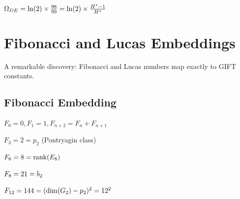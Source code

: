 \begin{theorem}\label{thm:Omega_DE_fraction}
    \leanok
    $\Omega_{DE} = \ln(2) \times \frac{98}{99} = \ln(2) \times \frac{H^* - 1}{H^*}$
\end{theorem}

\chapter{Fibonacci and Lucas Embeddings}\label{chap:sequences}

A remarkable discovery: Fibonacci and Lucas numbers map exactly to GIFT constants.

\section{Fibonacci Embedding}

\begin{definition}\label{def:fib}
    \leanok
    $F_0 = 0, F_1 = 1, F_{n+2} = F_n + F_{n+1}$
\end{definition}

\begin{theorem}[F3 = p2]\label{thm:fib_3_p2}
    \leanok
    $F_3 = 2 = p_2$ (Pontryagin class)
\end{theorem}

\begin{theorem}[F6 = rank(E8)]\label{thm:fib_6_rank}
    \leanok
    $F_6 = 8 = \mathrm{rank}(E_8)$
\end{theorem}

\begin{theorem}[F8 = b2]\label{thm:fib_8_b2}
    \leanok
    $F_8 = 21 = b_2$
\end{theorem}

\begin{theorem}[F12 = alpha\_s squared denominator]\label{thm:fib_12_alpha}
    \leanok
    $F_{12} = 144 = (\mathrm{dim}(G_2) - p_2)^2 = 12^2$
\end{theorem}

